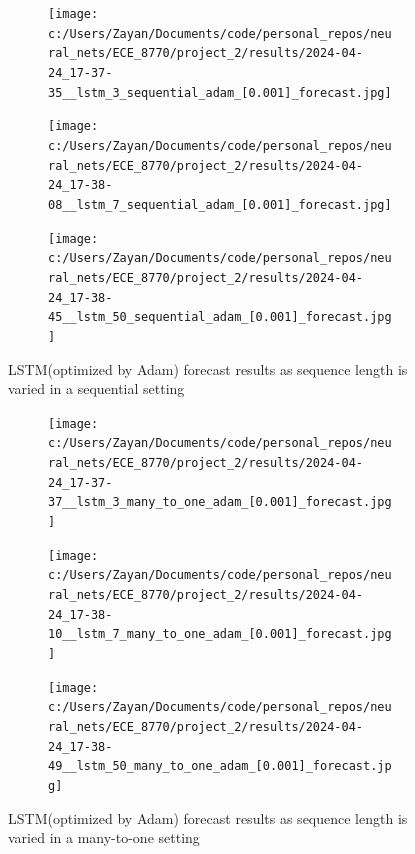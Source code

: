 \documentclass[12pt, letterpaper]{article}
\begin{document}
\begin{figure}[htpb]
    \centering
    \begin{subfigure}[b]{0.3\textwidth}
        \texttt{[image: c:/Users/Zayan/Documents/code/personal\_repos/neural\_nets/ECE\_8770/project\_2/results/2024-04-24\_17-37-35\_\_lstm\_3\_sequential\_adam\_[0.001]\_forecast.jpg]}
    \end{subfigure}
    \begin{subfigure}[b]{0.3\textwidth}
        \texttt{[image: c:/Users/Zayan/Documents/code/personal\_repos/neural\_nets/ECE\_8770/project\_2/results/2024-04-24\_17-38-08\_\_lstm\_7\_sequential\_adam\_[0.001]\_forecast.jpg]}
    \end{subfigure}
    \begin{subfigure}[b]{0.3\textwidth}
        \texttt{[image: c:/Users/Zayan/Documents/code/personal\_repos/neural\_nets/ECE\_8770/project\_2/results/2024-04-24\_17-38-45\_\_lstm\_50\_sequential\_adam\_[0.001]\_forecast.jpg]}
    \end{subfigure}
    \caption{LSTM(optimized by Adam) forecast results as sequence length is varied in a sequential setting}
    \label{fig: Adam-LSTM forecast results as sequence length is varied in a sequential setting}
\end{figure}

\begin{figure}[htpb]
    \centering
    \begin{subfigure}[b]{0.3\textwidth}
        \texttt{[image: c:/Users/Zayan/Documents/code/personal\_repos/neural\_nets/ECE\_8770/project\_2/results/2024-04-24\_17-37-37\_\_lstm\_3\_many\_to\_one\_adam\_[0.001]\_forecast.jpg]}
    \end{subfigure}
    \begin{subfigure}[b]{0.3\textwidth}
        \texttt{[image: c:/Users/Zayan/Documents/code/personal\_repos/neural\_nets/ECE\_8770/project\_2/results/2024-04-24\_17-38-10\_\_lstm\_7\_many\_to\_one\_adam\_[0.001]\_forecast.jpg]}
    \end{subfigure}
    \begin{subfigure}[b]{0.3\textwidth}
        \texttt{[image: c:/Users/Zayan/Documents/code/personal\_repos/neural\_nets/ECE\_8770/project\_2/results/2024-04-24\_17-38-49\_\_lstm\_50\_many\_to\_one\_adam\_[0.001]\_forecast.jpg]}
    \end{subfigure}
    \caption{LSTM(optimized by Adam) forecast results as sequence length is varied in a many-to-one setting}
    \label{fig: Adam-LSTM forecast results as sequence length is varied in a many-to-one setting}
\end{figure}
\end{document}
